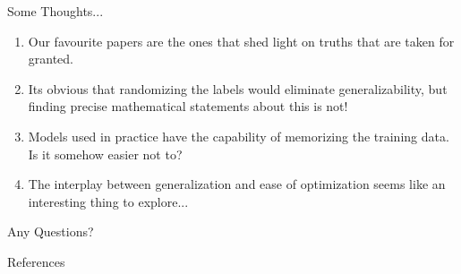 \documentclass[10pt]{beamer}
\begin{document}
\begin{frame}{Some Thoughts... }
	\begin{enumerate}
		\item Our favourite papers are the ones that shed light on truths that are taken for granted.
		\item Its obvious that randomizing the labels would eliminate generalizability, but finding precise mathematical statements about this is not!
		\item Models used in practice have the capability of memorizing the training data. Is it somehow easier not to?
		\item The interplay between generalization and ease of optimization seems like an interesting thing to explore...
	\end{enumerate}
	
	
\end{frame}	

{
	\begin{frame}[standout]
		Any Questions?
	\end{frame}
}

\begin{frame}{References}


\end{frame}	
	
\end{document}
